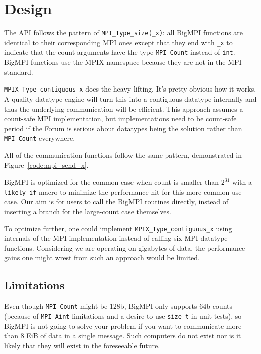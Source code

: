 
\section{Design}

The API follows the pattern of \texttt{MPI\_Type\_size(\_x)}: all BigMPI
functions are identical to their corresponding MPI ones except that
they end with \texttt{\_x} to indicate that the count arguments have the type
\texttt{MPI\_Count} instead of \texttt{int}.
BigMPI functions use the MPIX namespace because they are not in the
MPI standard.


\texttt{MPIX\_Type\_contiguous\_x}
does the heavy lifting.  It's pretty obvious how it works.
A quality datatype engine will turn this into a contiguous datatype internally 
and thus the underlying communication will be efficient.  
This approach assumes a count-safe MPI implementation, but implementations need
to be count-safe period if the Forum is serious about datatypes being
the solution rather than \texttt{MPI\_Count} everywhere.

All of the communication functions follow the same pattern, demonstrated in
Figure~\ref{code:mpi_send_x}.

BigMPI is optimized for the common case when count is smaller than $2^{31}$
with a \texttt{likely\_if} macro to minimize the performance hit for
this more common use case.  Our aim is for users to call the BigMPI routines
directly, instead of inserting a branch for the large-count case themselves.

To optimize further, one could implement
\texttt{MPIX\_Type\_contiguous\_x} using internals of the MPI implementation
instead of calling six MPI datatype functions.  Considering we are operating on
gigabytes of data, the performance gains one might wrest from such an approach
would be limited.

\subsection{Limitations}

Even though \texttt{MPI\_Count} might be 128b, BigMPI only supports
64b counts (because of \texttt{MPI\_Aint} limitations and a desire to use \texttt{size\_t}
in unit tests), so BigMPI is not going to solve your problem if you
want to communicate more than 8 EiB of data in a single message.
Such computers do not exist nor is it likely that they will exist
in the foreseeable future.

